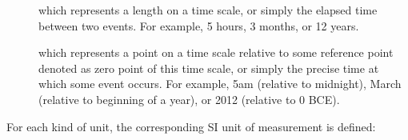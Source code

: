 \begin{description}
\item[]

\item[]

\item[]

\item[]

\item[]

\item[]

\item[]

\item[]

\item[]

\item[]

\item[]
  which represents a length on a time scale, or simply the elapsed time between two events. For example, 5 hours, 3 months, or 12 years.

\item[]
  which represents a point on a time scale relative to some reference point denoted as zero point of this time scale, or simply the precise time at which some event occurs.
  For example, 5am (relative to midnight), March (relative to beginning of a year), or 2012 (relative to 0 BCE).

\item[]
\end{description}


For each kind of unit, the corresponding SI unit of
measurement is defined:

